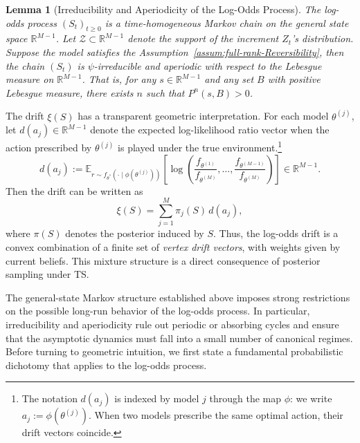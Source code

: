 \documentclass[12pt]{article}
\newtheorem{lemma}{Lemma}
\begin{document}
\begin{lemma}[Irreducibility and Aperiodicity of the Log-Odds Process]\label{lemma:irreducibility-and-aperiodicity-of-the-log-odds-process} The log-odds process $(S_t)_{t\geq 0}$ is a time-homogeneous Markov chain on the general state space $\mathbb{R}^{M-1}$. Let $\mathcal{Z} \subset \mathbb{R}^{M-1}$ denote the support of the increment $Z_t$'s distribution. Suppose the model satisfies the Assumption~\ref{assum:full-rank-Reversibility}, then the chain $(S_t)$ is $\psi$-irreducible and aperiodic with respect to the Lebesgue measure on $\mathbb{R}^{M-1}$. That is, for any $s \in \mathbb{R}^{M-1}$ and any set $B$ with positive Lebesgue measure, there exists $n$ such that $P^n(s, B) > 0$.
\end{lemma}

The drift $\xi(S)$ has a transparent geometric interpretation.
For each model $\theta^{(j)}$, let $d(a_j) \in \mathbb{R}^{M-1}$ denote the expected log-likelihood ratio vector when the action prescribed by $\theta^{(j)}$ is played under the true environment.\footnote{The notation $d(a_j)$ is indexed by model $j$ through the map $\phi$: we write $a_j := \phi(\theta^{(j)})$. When two models prescribe the same optimal action, their drift vectors coincide.}
\begin{equation}
    d(a_j) := \mathbb{E}_{r \sim f_{\theta^*}(\cdot \mid \phi(\theta^{(j)}))} \left[ \log \left( \frac{f_{\theta^{(1)}}}{f_{\theta^{(M)}}}, \ldots, \frac{f_{\theta^{(M-1)}}}{f_{\theta^{(M)}}} \right) \right] \in \mathbb{R}^{M-1}.
    \label{eq:drift_vector}
\end{equation}
Then the drift can be written as
\begin{equation}
\xi(S) = \sum_{j=1}^M \pi_j(S)\, d(a_j),
\label{eq:drift-convex-combination}
\end{equation}
where $\pi(S)$ denotes the posterior induced by $S$.
Thus, the log-odds drift is a convex combination of a finite set of \emph{vertex drift vectors}, with weights given by current beliefs. This mixture structure is a direct consequence of posterior sampling under TS.

The general-state Markov structure established above imposes strong restrictions on the possible long-run behavior of the log-odds process.
In particular, irreducibility and aperiodicity rule out periodic or absorbing cycles and ensure that the asymptotic dynamics must fall into a small number of canonical regimes.
Before turning to geometric intuition, we first state a fundamental probabilistic dichotomy that applies to the log-odds process.
\end{document}

